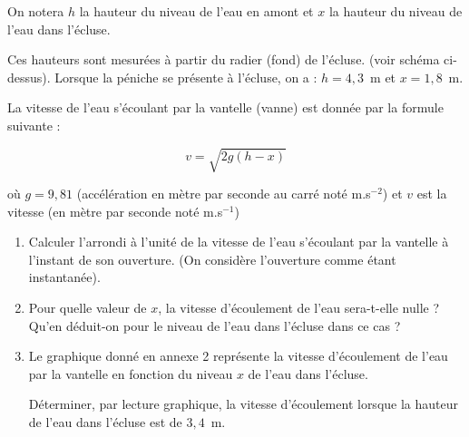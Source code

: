 On notera $h$ la hauteur du niveau de l'eau en amont et $x$ la hauteur du niveau de l'eau dans l'écluse. 

Ces hauteurs sont mesurées à partir du radier (fond) de l'écluse. (voir schéma ci-dessus). Lorsque la péniche se présente à l'écluse, on a : $h = 4,3$~m et $x = 1,8$~m.
 
La vitesse de l'eau s'écoulant par la vantelle (vanne) est donnée par la formule suivante : 

\[v = \sqrt{2g(h - x)}\]
 
où $g = 9,81$ (accélération en mètre par seconde au carré noté m.s$^{-2}$) et $v$ est la vitesse (en mètre par seconde noté m.s$^{-1}$) 

\medskip
 
\begin{enumerate}
\item Calculer l'arrondi à l'unité de la vitesse de l'eau s'écoulant par la vantelle à l'instant de son ouverture.
(On considère l'ouverture comme étant instantanée). 
\item Pour quelle valeur de $x$, la vitesse d'écoulement de l'eau sera-t-elle nulle ? Qu'en déduit-on pour le niveau de l'eau dans l'écluse dans ce cas ? 
\item Le graphique donné en annexe 2 représente la vitesse d'écoulement de l'eau par la vantelle en fonction du niveau $x$ de l'eau dans l'écluse. 

Déterminer, par lecture graphique, la vitesse d'écoulement lorsque la hauteur de l'eau dans l'écluse est de $3,4$~m. 
\end{enumerate}
 
\vspace{0,5cm}

